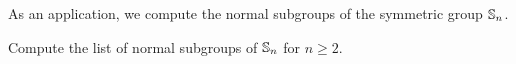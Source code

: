 As an application, we compute the normal subgroups 
of the symmetric group $\mathbb{S}_n$. 

\begin{exercise}
    Compute the list of normal subgroups of $\mathbb{S}_n$ for $n\geq2$. 
\end{exercise}

%
%
%
%
%
%
%
%    

